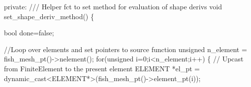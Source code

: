 \begin{DoxyCodeInclude}
\textcolor{keyword}{private}:
 \textcolor{comment}{}
\textcolor{comment}{ /// Helper fct to set method for evaluation of shape derivs}
\textcolor{comment}{} \textcolor{keywordtype}{void} set\_shape\_deriv\_method()
  \{
   
   \textcolor{keywordtype}{bool} done=\textcolor{keyword}{false};

   \textcolor{comment}{//Loop over elements and set pointers to source function}
   \textcolor{keywordtype}{unsigned} n\_element = fish\_mesh\_pt()->nelement();
   \textcolor{keywordflow}{for}(\textcolor{keywordtype}{unsigned} i=0;i<n\_element;i++)
    \{
     \textcolor{comment}{// Upcast from FiniteElement to the present element}
     ELEMENT *el\_pt = \textcolor{keyword}{dynamic\_cast<}ELEMENT*\textcolor{keyword}{>}(fish\_mesh\_pt()->element\_pt(i));
     

\end{DoxyCodeInclude}
